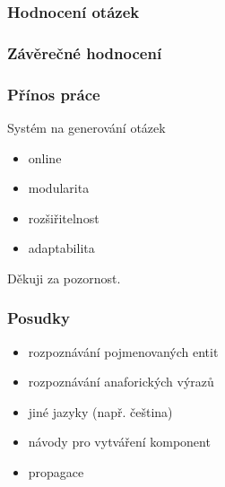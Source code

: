 \documentclass[xcolor=svgnames]{beamer}
\begin{document}
\begin{frame}
\frametitle{Hodnocení otázek}
\begin{center}


\end{center}
\end{frame}
\begin{frame}
\frametitle{Závěrečné hodnocení}
\begin{center}


\end{center}
\end{frame}
\begin{frame}
\frametitle{Přínos práce}
Systém na generování otázek
\begin{itemize}
\item online
\item modularita
\item rozšiřitelnost
\item adaptabilita
\end{itemize}
\end{frame}
\begin{frame}[plain]
\begin{center}
Děkuji za pozornost.
\end{center}
\end{frame}
\begin{frame}
\frametitle{Posudky}
\begin{itemize}
\item rozpoznávání pojmenovaných entit
\item rozpoznávání anaforických výrazů
\item jiné jazyky (např. čeština)
\item návody pro vytváření komponent
\item propagace
\end{itemize}
\end{frame}
\end{document}
